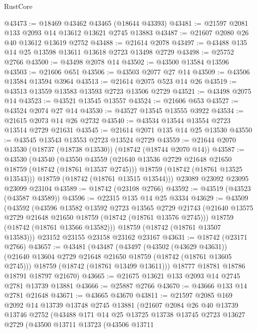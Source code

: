 \begin{lexlean}{RustCore}
\begin{coremodule}
@43473 := @18469 @43462 @43465 (@18644 @43393)
@43481 := @21597 @2081 @133 @2093 @14 @13612 @13621 @2745 @13883
@43487 := @21607 @2080 @26 @40 @13612 @13619 @2752
@43488 := @21614 @2078
@43497 := @43488 @135 @14 @25 @13598 @13611 @13618 @2723 @13498 @2729
@43498 := @25752 @2766
@43500 := @43498 @2078 @14
@43502 := @43500 @13584 @13596
@43503 := @21606 @651
@43506 := @43503 @2077 @27 @14
@43509 := @43506 @13584 @13594 @3964
@43513 := @21614 @2075 @523 @14 @26
@43519 := @43513 @13559 @13583 @13593 @2723 @13506 @2729
@43521 := @43498 @2075 @14
@43523 := @43521 @13545 @13557
@43524 := @21606 @653
@43527 := @43524 @2074 @27 @14
@43530 := @43527 @13545 @13555 @3922
@43534 := @21615 @2073 @14 @26 @2732
@43540 := @43534 @13544 @13554 @2723 @13514 @2729 @21631
@43545 := @21614 @2071 @135 @14 @25 @13530
@43550 := @43545 @13543 @13553 @2723 @13524 @2729
@43559 := @21644 @2070 @13530 (@18737 (@18738 @13530)) (@18742 (@18744 @2070 @14))
@43587 := @43530
    (@43540
      (@43550
        @43559
        (@21640 @13536 @2729 @21648 @21650 @18759 (@18742 (@18761 @13537 @2745)))
        @18759
        (@18742 (@18761 @13525 @13543)))
      @18759
      (@18742 (@18761 @13515 @13544)))
    @23089
    @23092
    @23095
    @23099
    @23104
@43589 := @18742 (@23108 @2766)
@43592 := @43519 (@43523 (@43587 @43589))
@43596 := @22315 @135 @14 @25 @3334
@43629 := @43509
    (@43592
      (@43596
        @13582
        @13592
        @2723
        @13565
        @2729
        @21743
        (@21640 @13575 @2729 @21648 @21650 @18759 (@18742 (@18761 @13576 @2745)))
        @18759
        (@18742 (@18761 @13566 @13582)))
      @18759
      (@18742 (@18761 @13507 @13583)))
    @23152
    @23155
    @23158
    @23162
    @23167
@43631 := @18742 (@23171 @2766)
@43657 := @43481
    (@43487
      (@43497
        (@43502 (@43629 @43631))
        (@21640 @13604 @2729 @21648 @21650 @18759 (@18742 (@18761 @13605 @2745)))
        @18759
        (@18742 (@18761 @13499 @13611)))
      @18777
      @18781
      @18786
      @18791
      @18797
      @21670)
@43665 := @21675 @13621 @133 @2093 @14 @2745 @2781 @13739 @13881
@43666 := @25887 @2766
@43670 := @43666 @133 @14 @2781 @21648
@43671 := @43665 @43670
@43811 := @21597
    @2085
    @169
    @2092
    @14
    @13739
    @13748
    @2745
    @13881
    (@21607
      @2084
      @26
      @40
      @13739
      @13746
      @2752
      (@43488
        @171
        @14
        @25
        @13725
        @13738
        @13745
        @2723
        @13627
        @2729
        (@43500
          @13711
          @13723
          (@43506
            @13711

\end{coremodule}
\end{lexlean}
